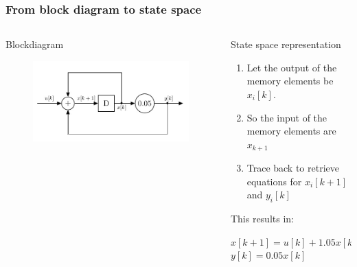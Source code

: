 \begin{frame}
\frametitle{From block diagram to state space }
\begin{columns}

\begin{column}{0.5\textwidth}
	\begin{block}{Blockdiagram}
		\begin{figure}
			\centering
			\includegraphics[width=1\linewidth]{Images/discrete_time_systems_3}
			\label{fig:discrete_time_systems_3}
		\end{figure}
	\end{block}
	
\end{column}
\begin{column}{0.5\textwidth}
	\begin{block}{State space representation}
		\begin{enumerate}
			\item Let the output of the memory elements be $x_{i}[k]$. 
			\item So the input of the memory elements are $x_{k+1}$
			\item Trace back to retrieve equations for $x_i[k+1] $   and $y_i[k]$ 
		\end{enumerate}
		This results in:
		\begin{center}
				$x[k+1] = u[k] + 1.05 x[k] $
				$y[k] = 0.05 x[k]$
		\end{center}
	\end{block}
\end{column}
\end{columns}
\end{frame}
